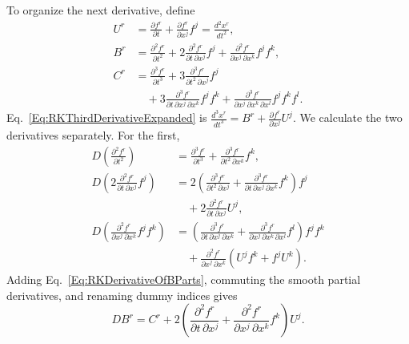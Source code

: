 To organize the next derivative, define
\begin{equation}\label{Eq:RKDerivativeShorthands}
\begin{aligned}
 U^r&=\frac{\partial f^r}{\partial t}
          +\frac{\partial f^r}{\partial x^j}f^j
          =\frac{d^2x^r}{dt^2},\\
 B^r&=\frac{\partial^2f^r}{\partial t^2}
       +2\frac{\partial^2f^r}{\partial t\,\partial x^j}f^j
       +\frac{\partial^2f^r}{\partial x^j\,\partial x^k}f^j f^k,\\
 C^r&=\frac{\partial^3f^r}{\partial t^3}
       +3\frac{\partial^3f^r}{\partial t^2\,\partial x^j}f^j\\
    &\quad+3\frac{\partial^3f^r}{\partial t\,\partial x^j\,\partial x^k}f^j f^k
       +\frac{\partial^3f^r}{\partial x^j\,\partial x^k\,\partial x^l}f^j f^k f^l.
\end{aligned}
\end{equation}
Eq.~\ref{Eq:RKThirdDerivativeExpanded} is
$\frac{d^3x^r}{dt^3}=B^r+\frac{\partial f^r}{\partial x^j}U^j$.
We calculate the two derivatives separately. For the first,
\begin{align}
 D\left(\frac{\partial^2f^r}{\partial t^2}\right)
 &=\frac{\partial^3f^r}{\partial t^3}
       +\frac{\partial^3f^r}{\partial t^2\,\partial x^k}f^k,\nonumber\\
 D\left(2\frac{\partial^2f^r}{\partial t\,\partial x^j}f^j\right)
 &=2\left(\frac{\partial^3f^r}{\partial t^2\,\partial x^j}
       +\frac{\partial^3f^r}{\partial t\,\partial x^j\,\partial x^k}f^k\right)f^j
       \nonumber\\
 &\quad+2\frac{\partial^2f^r}{\partial t\,\partial x^j}U^j,\nonumber\\
 D\left(\frac{\partial^2f^r}{\partial x^j\,\partial x^k}f^j f^k\right)
 &=\left(\frac{\partial^3f^r}{\partial t\,\partial x^j\,\partial x^k}
       +\frac{\partial^3f^r}{\partial x^j\,\partial x^k\,\partial x^l}f^l\right)
       f^j f^k\nonumber\\
 &\quad+\frac{\partial^2f^r}{\partial x^j\,\partial x^k}
       (U^j f^k+f^j U^k).
 \label{Eq:RKDerivativeOfBParts}
\end{align}
Adding Eq.~\ref{Eq:RKDerivativeOfBParts}, commuting the smooth partial
derivatives, and renaming dummy indices gives
\begin{equation}\label{Eq:RKDerivativeOfB}
 DB^r=C^r+2\left(\frac{\partial^2f^r}{\partial t\,\partial x^j}
               +\frac{\partial^2f^r}{\partial x^j\,\partial x^k}f^k\right)U^j.
\end{equation}
